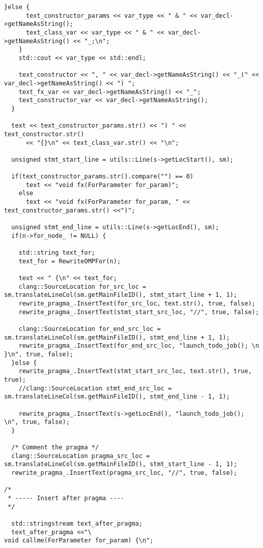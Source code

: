 \documentclass[a4paper,11pt,twoside]{book}
\begin{document}
\begin{lstlisting}[language=CCC, caption=driver/program.cpp]
    }else {
      text_constructor_params << var_type << " & " << var_decl->getNameAsString();
      text_class_var << var_type << " & " << var_decl->getNameAsString() << "_;\n";
    }
    std::cout << var_type << std::endl;

    text_constructor << ", " << var_decl->getNameAsString() << "_(" << var_decl->getNameAsString() << ") ";
    text_fx_var << var_decl->getNameAsString() << "_";
    text_constructor_var << var_decl->getNameAsString();
  }

  text << text_constructor_params.str() << ") " << text_constructor.str() 
      << "{}\n" << text_class_var.str() << "\n";    
  
  unsigned stmt_start_line = utils::Line(s->getLocStart(), sm);
  
  if(text_constructor_params.str().compare("") == 0)
      text << "void fx(ForParameter for_param)";
    else
      text << "void fx(ForParameter for_param, " << text_constructor_params.str() <<")";
  
  unsigned stmt_end_line = utils::Line(s->getLocEnd(), sm);
  if(n->for_node_ != NULL) {
    
    std::string text_for;
    text_for = RewriteOMPFor(n);

    text << " {\n" << text_for;
    clang::SourceLocation for_src_loc = sm.translateLineCol(sm.getMainFileID(), stmt_start_line + 1, 1);
    rewrite_pragma_.InsertText(for_src_loc, text.str(), true, false);
    rewrite_pragma_.InsertText(stmt_start_src_loc, "//", true, false);
    
    clang::SourceLocation for_end_src_loc = sm.translateLineCol(sm.getMainFileID(), stmt_end_line + 1, 1);
    rewrite_pragma_.InsertText(for_end_src_loc, "launch_todo_job(); \n }\n", true, false);
  }else {
    rewrite_pragma_.InsertText(stmt_start_src_loc, text.str(), true, true);
    //clang::SourceLocation stmt_end_src_loc = sm.translateLineCol(sm.getMainFileID(), stmt_end_line - 1, 1);
    
    rewrite_pragma_.InsertText(s->getLocEnd(), "launch_todo_job(); \n", true, false);
  }

  /* Comment the pragma */
  clang::SourceLocation pragma_src_loc = sm.translateLineCol(sm.getMainFileID(), stmt_start_line - 1, 1);
  rewrite_pragma_.InsertText(pragma_src_loc, "//", true, false);
  
/*
 * ----- Insert after pragma ----
 */
   
  std::stringstream text_after_pragma;
  text_after_pragma <<"\
void callme(ForParameter for_param) {\n";


\end{lstlisting}
\end{document}
